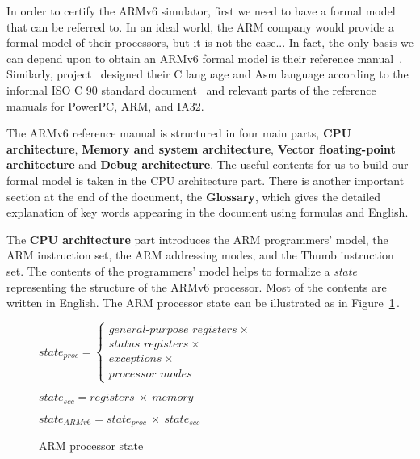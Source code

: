 \newcommand{\state}{\textit{state}\xspace}
\newcommand{\armst}{\state}
\newcommand{\bit}[1]{\texttt{#1}\xspace}
\newcommand{\inst}[1]{\texttt{#1}\xspace}
\newcommand{\adc}{\inst{ADC}\xspace}
\newcommand{\armkw}[1]{\texttt{#1}\xspace}
\newcommand{\unpred}{\armkw{UNPREDICTABLE}\xspace}
\newcommand{\armvar}[1]{\emph{#1}}
\newcommand{\armrf}[1]{\texttt{#1}\xspace}
\newcommand{\coqcode}[1]{\texttt{#1}\xspace}
In order to certify the ARMv6 simulator, first we need to have a formal
model that can be referred to.
In an ideal world, the ARM company would provide a formal model of their processors,
but it is not the case...
In fact, the only basis we can depend upon to obtain an ARMv6 formal model
is their reference manual~\cite{arm6refman}.
Similarly, \compcert project~\cite{ccc} designed their \compcert C language and Asm language
according to the informal ISO C 90 standard document~\cite{C90} and relevant parts of
the reference manuals for PowerPC, ARM, and IA32.

The ARMv6 reference manual
is structured in four main parts, {\bf CPU architecture}, {\bf Memory and system architecture},
{\bf Vector floating-point architecture} and {\bf Debug architecture}.
The useful contents for us to build our formal model is taken in the CPU architecture part.
There is another important section at the end of the document,
the {\bf Glossary},
which gives the detailed explanation of key words appearing in the
document using formulas and English.

The {\bf CPU architecture} part introduces the ARM programmers' model, the ARM instruction set,
the ARM addressing modes, and the Thumb instruction set.
The contents of the programmers' model helps to formalize a \armst representing the
structure of the ARMv6 processor.
Most of the contents are written in English.
The ARM processor state can be illustrated as in Figure~\ref{fig:armst}\,.

\begin{figure}[h]
\centering
$\state_{proc} = \left\{
  \begin{array}{l}
    \textit{general-purpose~registers} ~\times\\
     \textit{status~registers} ~\times\\
     \textit{exceptions} ~\times\\
     \textit{processor~modes}
   \end{array}
 \right.$

\medskip

$\state_{scc}=\textit{registers}~\times~\textit{memory}$

$\state_{ARMv6}=\state_{proc}~\times~\state_{scc}$
\caption{ARM processor state}
\label{fig:armst}
\end{figure}


